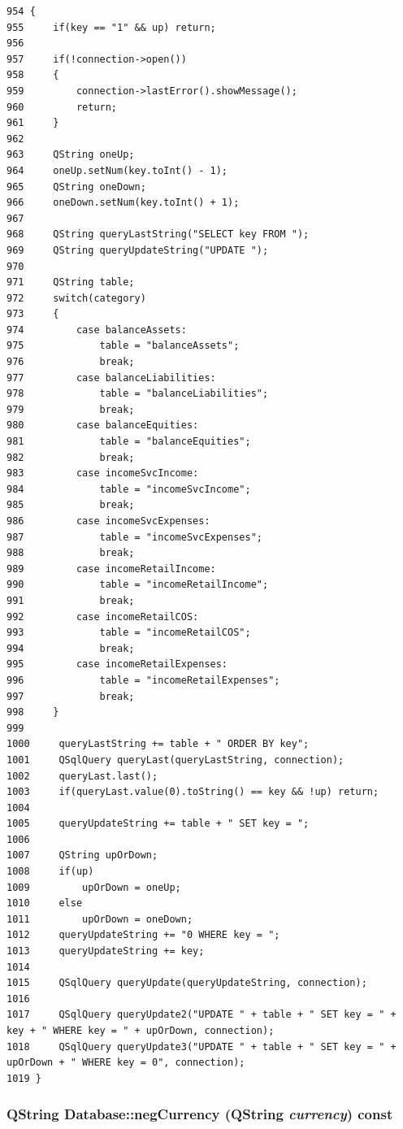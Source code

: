 \footnotesize\begin{verbatim}954 {
955     if(key == "1" && up) return;
956     
957     if(!connection->open())
958     {
959         connection->lastError().showMessage();
960         return;
961     }
962     
963     QString oneUp;
964     oneUp.setNum(key.toInt() - 1);
965     QString oneDown;
966     oneDown.setNum(key.toInt() + 1);
967 
968     QString queryLastString("SELECT key FROM ");
969     QString queryUpdateString("UPDATE ");
970     
971     QString table;
972     switch(category)
973     {
974         case balanceAssets:
975             table = "balanceAssets";
976             break;
977         case balanceLiabilities:
978             table = "balanceLiabilities";
979             break;
980         case balanceEquities:
981             table = "balanceEquities";
982             break;
983         case incomeSvcIncome:
984             table = "incomeSvcIncome";
985             break;
986         case incomeSvcExpenses:
987             table = "incomeSvcExpenses";
988             break;
989         case incomeRetailIncome:
990             table = "incomeRetailIncome";
991             break;
992         case incomeRetailCOS:
993             table = "incomeRetailCOS";
994             break;
995         case incomeRetailExpenses:
996             table = "incomeRetailExpenses";
997             break;
998     }
999 
1000     queryLastString += table + " ORDER BY key";
1001     QSqlQuery queryLast(queryLastString, connection);
1002     queryLast.last();
1003     if(queryLast.value(0).toString() == key && !up) return;
1004     
1005     queryUpdateString += table + " SET key = ";
1006     
1007     QString upOrDown;
1008     if(up)
1009         upOrDown = oneUp;
1010     else
1011         upOrDown = oneDown;
1012     queryUpdateString += "0 WHERE key = ";
1013     queryUpdateString += key;
1014 
1015     QSqlQuery queryUpdate(queryUpdateString, connection);
1016     
1017     QSqlQuery queryUpdate2("UPDATE " + table + " SET key = " + key + " WHERE key = " + upOrDown, connection);
1018     QSqlQuery queryUpdate3("UPDATE " + table + " SET key = " + upOrDown + " WHERE key = 0", connection);
1019 }
\end{verbatim}\normalsize 


\hypertarget{classDatabase_a47}{
\subsubsection[negCurrency]{\setlength{\rightskip}{0pt plus 5cm}QString Database::neg\-Currency (QString {\em currency}) const}}
\label{classDatabase_a47}


